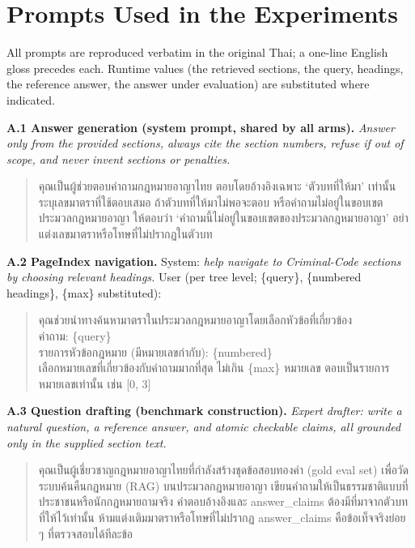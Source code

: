 \documentclass[conference]{IEEEtran}
\providecommand{\TH}{}\renewcommand{\TH}[1]{{\thaifont #1}}
\begin{document}
\appendices

\section{Prompts Used in the Experiments}
\label{app:prompts}

All prompts are reproduced verbatim in the original Thai; a one-line English gloss precedes each.
Runtime values (the retrieved sections, the query, headings, the reference answer, the answer under
evaluation) are substituted where indicated.

\smallskip\noindent\textbf{A.1 Answer generation (system prompt, shared by all arms).}
\emph{Answer only from the provided sections, always cite the section numbers, refuse if out of
scope, and never invent sections or penalties.}
\begin{quote}\footnotesize
\TH{คุณเป็นผู้ช่วยตอบคำถามกฎหมายอาญาไทย ตอบโดยอ้างอิงเฉพาะ ‘ตัวบทที่ให้มา’ เท่านั้น ระบุเลขมาตราที่ใช้ตอบเสมอ ถ้าตัวบทที่ให้มาไม่พอจะตอบ หรือคำถามไม่อยู่ในขอบเขตประมวลกฎหมายอาญา ให้ตอบว่า ‘คำถามนี้ไม่อยู่ในขอบเขตของประมวลกฎหมายอาญา’ อย่าแต่งเลขมาตราหรือโทษที่ไม่ปรากฏในตัวบท}
\end{quote}

\smallskip\noindent\textbf{A.2 PageIndex navigation.}
System: \emph{help navigate to Criminal-Code sections by choosing relevant headings.} User (per tree
level; \{query\}, \{numbered headings\}, \{max\} substituted):
\begin{quote}\footnotesize
\TH{คุณช่วยนำทางค้นหามาตราในประมวลกฎหมายอาญาโดยเลือกหัวข้อที่เกี่ยวข้อง}\\[2pt]
\TH{คำถาม:} \{query\}\\
\TH{รายการหัวข้อกฎหมาย (มีหมายเลขกำกับ):} \{numbered\}\\
\TH{เลือกหมายเลขที่เกี่ยวข้องกับคำถามมากที่สุด ไม่เกิน} \{max\} \TH{หมายเลข ตอบเป็นรายการหมายเลขเท่านั้น เช่น} [0, 3]
\end{quote}

\smallskip\noindent\textbf{A.3 Question drafting (benchmark construction).}
\emph{Expert drafter: write a natural question, a reference answer, and atomic checkable claims, all
grounded only in the supplied section text.}
\begin{quote}\footnotesize
\TH{คุณเป็นผู้เชี่ยวชาญกฎหมายอาญาไทยที่กำลังสร้างชุดข้อสอบทองคำ (gold eval set) เพื่อวัดระบบค้นคืนกฎหมาย (RAG) บนประมวลกฎหมายอาญา เขียนคำถามให้เป็นธรรมชาติแบบที่ประชาชนหรือนักกฎหมายถามจริง คำตอบอ้างอิงและ answer\_claims ต้องมีที่มาจากตัวบทที่ให้ไว้เท่านั้น ห้ามแต่งเติมมาตราหรือโทษที่ไม่ปรากฏ answer\_claims คือข้อเท็จจริงย่อย ๆ ที่ตรวจสอบได้ทีละข้อ}
\end{quote}
\end{document}
